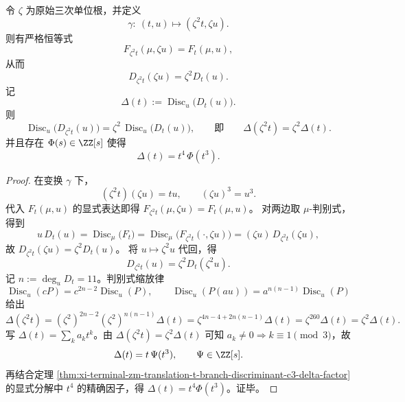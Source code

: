 \begin{theorem}\label{thm:xi-terminal-zm-translation-t-branch-discriminant-c3-mu3-weight}
令 \(\zeta\) 为原始三次单位根，并定义
\[
\gamma:\ (t,u)\longmapsto(\zeta^2 t,\zeta u).
\]
则有严格恒等式
\[
F_{\zeta^2 t}(\mu,\zeta u)=F_t(\mu,u),
\]
从而
\[
D_{\zeta^2 t}(\zeta u)=\zeta^2D_t(u).
\]
记
\[
\Delta(t):=\operatorname{Disc}_u\!\bigl(D_t(u)\bigr).
\]
则
\[
\operatorname{Disc}_{u}\!\bigl(D_{\zeta^2 t}(u)\bigr)=\zeta^2\,\operatorname{Disc}_{u}\!\bigl(D_t(u)\bigr),
\qquad\text{即}\qquad
\Delta(\zeta^2 t)=\zeta^2\Delta(t).
\]
并且存在 \(\Phi(s)\in\ZZ[s]\) 使得
\[
\Delta(t)=t^4\,\Phi(t^3).
\]
\end{theorem}
\begin{proof}
在变换 \(\gamma\) 下，
\[
(\zeta^2 t)(\zeta u)=tu,\qquad (\zeta u)^3=u^3.
\]
代入 \(F_t(\mu,u)\) 的显式表达即得 \(F_{\zeta^2 t}(\mu,\zeta u)=F_t(\mu,u)\)。
对两边取 \(\mu\)-判别式，得到
\[
u\,D_t(u)=\operatorname{Disc}_{\mu}\!\bigl(F_t\bigr)
=\operatorname{Disc}_{\mu}\!\bigl(F_{\zeta^2 t}(\cdot,\zeta u)\bigr)
=(\zeta u)\,D_{\zeta^2 t}(\zeta u),
\]
故 \(D_{\zeta^2 t}(\zeta u)=\zeta^2D_t(u)\)。
将 \(u\mapsto \zeta^2u\) 代回，得
\[
D_{\zeta^2 t}(u)=\zeta^2D_t(\zeta^2u).
\]
记 \(n:=\deg_u D_t=11\)。判别式缩放律
\[
\operatorname{Disc}_u(cP)=c^{2n-2}\operatorname{Disc}_u(P),\qquad
\operatorname{Disc}_u(P(au))=a^{n(n-1)}\operatorname{Disc}_u(P)
\]
给出
\[
\Delta(\zeta^2 t)
=(\zeta^2)^{2n-2}(\zeta^2)^{n(n-1)}\Delta(t)
=\zeta^{4n-4+2n(n-1)}\Delta(t)
=\zeta^{260}\Delta(t)
=\zeta^2\Delta(t).
\]
写 \(\Delta(t)=\sum_k a_k t^k\)。由 \(\Delta(\zeta^2 t)=\zeta^2\Delta(t)\) 可知 \(a_k\neq 0\Rightarrow k\equiv 1\pmod 3\)，故
\[
\Delta(t)=t\,\Psi(t^3),\qquad \Psi\in\ZZ[s].
\]
再结合定理 \ref{thm:xi-terminal-zm-translation-t-branch-discriminant-c3-delta-factor} 的显式分解中 \(t^4\) 的精确因子，得 \(\Delta(t)=t^4\Phi(t^3)\)。证毕。
\end{proof}

